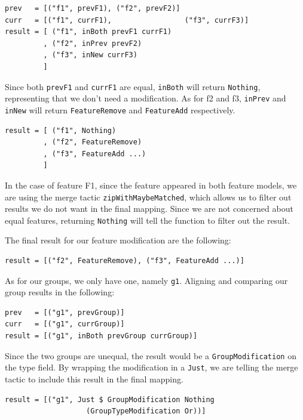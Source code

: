 \documentclass[a4paper,english]{ifimaster}
\begin{document}
\begin{verbatim}
prev   = [("f1", prevF1), ("f2", prevF2)]
curr   = [("f1", currF1),                 ("f3", currF3)]
result = [ ("f1", inBoth prevF1 currF1)
         , ("f2", inPrev prevF2)
         , ("f3", inNew currF3)
         ]
\end{verbatim}

Since both \texttt{prevF1} and \texttt{currF1} are equal, \texttt{inBoth} will return \texttt{Nothing}, representing that we don't need a modification. As for f2 and f3, \texttt{inPrev} and \texttt{inNew} will return \texttt{FeatureRemove} and \texttt{FeatureAdd} respectively.

\begin{verbatim}
result = [ ("f1", Nothing)
         , ("f2", FeatureRemove)
         , ("f3", FeatureAdd ...)
         ]
\end{verbatim}

In the case of feature F1, since the feature appeared in both feature models, we are using the merge tactic \texttt{zipWithMaybeMatched}, which allows us to filter out results we do not want in the final mapping. Since we are not concerned about equal features, returning \texttt{Nothing} will tell the function to filter out the result.

The final result for our feature modification are the following:

\begin{verbatim}
result = [("f2", FeatureRemove), ("f3", FeatureAdd ...)]
\end{verbatim}

As for our groups, we only have one, namely \texttt{g1}. Aligning and comparing our group results in the following:

\begin{verbatim}
prev   = [("g1", prevGroup)]
curr   = [("g1", currGroup)]
result = [("g1", inBoth prevGroup currGroup)]
\end{verbatim}

Since the two groups are unequal, the result would be a \texttt{GroupModification} on the type field. By wrapping the modification in a \texttt{Just}, we are telling the merge tactic to include this result in the final mapping.

\begin{verbatim}
result = [("g1", Just $ GroupModification Nothing 
                   (GroupTypeModification Or))]
\end{verbatim}
\end{document}
